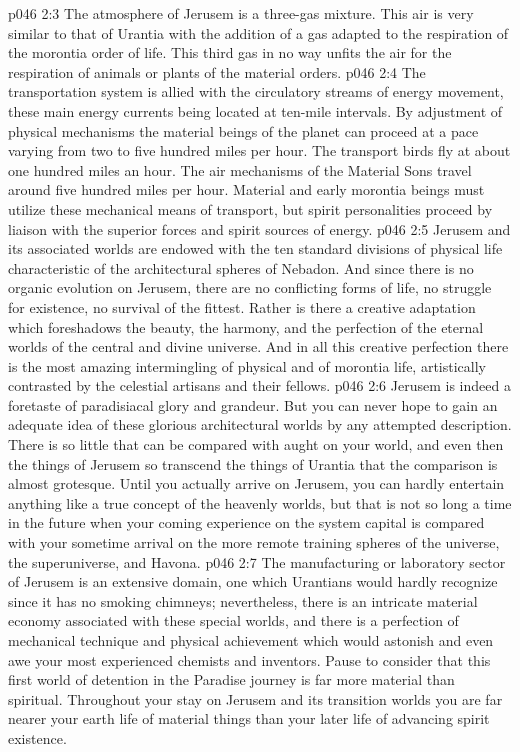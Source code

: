 \vs p046 2:3 The atmosphere of Jerusem is a three\hyp{}gas mixture. This air is very similar to that of Urantia with the addition of a gas adapted to the respiration of the morontia order of life. This third gas in no way unfits the air for the respiration of animals or plants of the material orders.
\vs p046 2:4 The transportation system is allied with the circulatory streams of energy movement, these main energy currents being located at ten\hyp{}mile intervals. By adjustment of physical mechanisms the material beings of the planet can proceed at a pace varying from two to five hundred miles per hour. The transport birds fly at about one hundred miles an hour. The air mechanisms of the Material Sons travel around five hundred miles per hour. Material and early morontia beings must utilize these mechanical means of transport, but spirit personalities proceed by liaison with the superior forces and spirit sources of energy.
\pc \vs p046 2:5 Jerusem and its associated worlds are endowed with the ten standard divisions of physical life characteristic of the architectural spheres of Nebadon. And since there is no organic evolution on Jerusem, there are no conflicting forms of life, no struggle for existence, no survival of the fittest. Rather is there a creative adaptation which foreshadows the beauty, the harmony, and the perfection of the eternal worlds of the central and divine universe. And in all this creative perfection there is the most amazing intermingling of physical and of morontia life, artistically contrasted by the celestial artisans and their fellows.\plusone
\vs p046 2:6 Jerusem is indeed a foretaste of paradisiacal glory and grandeur. But you can never hope to gain an adequate idea of these glorious architectural worlds by any attempted description. There is so little that can be compared with aught on your world, and even then the things of Jerusem so transcend the things of Urantia that the comparison is almost grotesque. Until you actually arrive on Jerusem, you can hardly entertain anything like a true concept of the heavenly worlds, but that is not so long a time in the future when your coming experience on the system capital is compared with your sometime arrival on the more remote training spheres of the universe, the superuniverse, and Havona.
\pc \vs p046 2:7 The manufacturing or laboratory sector of Jerusem is an extensive domain, one which Urantians would hardly recognize since it has no smoking chimneys; nevertheless, there is an intricate material economy associated with these special worlds, and there is a perfection of mechanical technique and physical achievement which would astonish and even awe your most experienced chemists and inventors. Pause to consider that this first world of detention in the Paradise journey is far more material than spiritual. Throughout your stay on Jerusem and its transition worlds you are far nearer your earth life of material things than your later life of advancing spirit existence.
